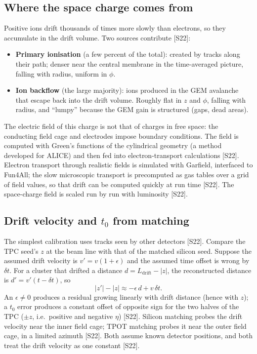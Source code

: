 \documentclass[11pt,letterpaper]{article}
\begin{document}
\subsection{Where the space charge comes from}
Positive ions drift thousands of times more slowly than electrons, so they accumulate in the drift volume. Two sources contribute [S22]:
\begin{itemize}
\item \textbf{Primary ionisation} (a few percent of the total): created by tracks along their path; denser near the central membrane in the time-averaged picture, falling with radius, uniform in $\phi$.
\item \textbf{Ion backflow} (the large majority): ions produced in the GEM avalanche that escape back into the drift volume. Roughly flat in $z$ and $\phi$, falling with radius, and ``lumpy'' because the GEM gain is structured (gaps, dead areas).
\end{itemize}
The electric field of this charge is not that of charges in free space: the conducting field cage and electrodes impose boundary conditions.
The field is computed with Green's functions of the cylindrical geometry (a method developed for ALICE) and then fed into electron-transport calculations [S22].
Electron transport through realistic fields is simulated with Garfield, interfaced to Fun4All; the slow microscopic transport is precomputed as gas tables over a grid of field values, so that drift can be computed quickly at run time [S22].
The space-charge field is scaled run by run with luminosity [S22].

\subsection{Drift velocity and $t_0$ from matching}
The simplest calibration uses tracks seen by other detectors [S22]. Compare the TPC seed's $z$ at the beam line with that of the matched silicon seed.
Suppose the assumed drift velocity is $v'=v(1+\epsilon)$ and the assumed time offset is wrong by $\delta t$. For a cluster that drifted a distance $d=L_{\mathrm{drift}}-|z|$,
the reconstructed distance is $d'=v'(t-\delta t)$, so
\begin{equation}
|z'|-|z| \approx -\epsilon\,d + v\,\delta t .
\end{equation}
An $\epsilon\neq0$ produces a residual growing linearly with drift distance (hence with $z$); a $t_0$ error produces a constant offset of opposite sign for the two halves of the TPC ($\pm z$, i.e.\ positive and negative $\eta$) [S22].
Silicon matching probes the drift velocity near the inner field cage; TPOT matching probes it near the outer field cage, in a limited azimuth [S22]. Both assume known detector positions, and both treat the drift velocity as one constant [S22].
\end{document}
